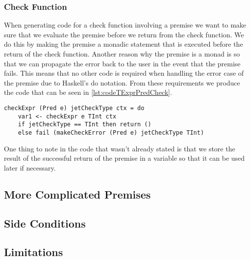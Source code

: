\subsubsection{Check Function}
When generating code for a check function involving a premise we want to make sure that we evaluate the premise before we return from the check function.
We do this by making the premise a monadic statement that is executed before the return of the check function.
Another reason why the premise is a monad is so that we can propagate the error back to the user in the event that the premise fails.
This means that no other code is required when handling the error case of the premise due to Haskell's do notation.
From these requirements we produce the code that can be seen in \autoref{lst:codeTExprPredCheck}.

\begin{lstlisting}[caption = Code generated for checkExpr from TExprPred, label=lst:codeTExprPredCheck]
checkExpr (Pred e) jetCheckType ctx = do
    var1 <- checkExpr e TInt ctx
    if jetCheckType == TInt then return () 
    else fail (makeCheckError (Pred e) jetCheckType TInt)
\end{lstlisting}

One thing to note in the code that wasn't already stated is that we store the result of the successful return of the premise in a variable so that it can be used later if necessary.

\subsection{More Complicated Premises}
\subsection{Side Conditions}
\subsection{Limitations}